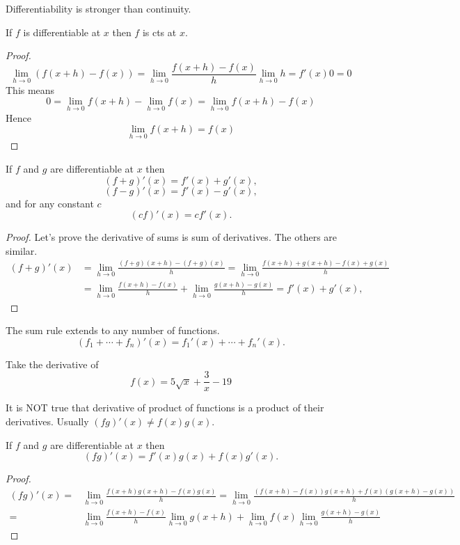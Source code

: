 \documentclass[calc1-main.tex]{subfiles}
\begin{document}
  Differentiability is stronger than continuity.
  \begin{theorem}
    If $f$ is differentiable at $x$ then $f$ is cts at $x$.
  \end{theorem}

  \begin{proof}
    \[
      \lim_{h \to 0} (f(x+h) - f(x)) =
      \lim_{h \to 0} \dfrac{f(x+h) - f(x)}{h}
      \lim_{h \to 0} h = f'(x) 0 = 0
    \]
    This means
    \[
      0 =
      \lim_{h \to 0} f(x+h) - \lim_{h \to 0} f(x) =
      \lim_{h \to 0} f(x+h) - f(x)
    \]
    Hence
    \[
      \lim_{h \to 0} f(x+h) = f(x)
    \]
  \end{proof}

  \begin{theorem}
    If $f$ and $g$ are differentiable at $x$ then
    \[
      (f+g)'(x) = f'(x) + g'(x),
    \]
    \[
      (f-g)'(x) = f'(x) - g'(x),
    \]
    and for any constant $c$
    \[
      (c f)'(x) = c f'(x).
    \]
  \end{theorem}
  \begin{proof}
    Let's prove the derivative of sums is sum of derivatives. The others are similar.
    \[
      \begin{split}
        (f+g)'(x) &=
        \lim_{h \to 0} \frac{(f+g)(x+h) - (f+g)(x)}{h} =
        \lim_{h \to 0} \frac{f(x+h)+g(x+h) - f(x)+g(x)}{h} \\
        & = \lim_{h \to 0} \frac{f(x+h)-f(x)}{h} +
        \lim_{h \to 0} \frac{g(x+h)-g(x)}{h} =
        f'(x) + g'(x),
      \end{split}
    \]
  \end{proof}

  The sum rule extends to any number of functions.
  \[
    (f_1 + \cdots + f_n)'(x) = f_1'(x) + \cdots + f_n'(x).
  \]

  \begin{example}
    Take the derivative of
    \[
      f(x) = 5 \sqrt{x} + \frac{3}{x} - 19
    \]
  \end{example}

  It is NOT true that derivative of product of functions is a product of their derivatives. Usually $(fg)'(x) \neq f(x) g(x)$.

  \begin{theorem}
    If $f$ and $g$ are differentiable at $x$ then
    \[
      (f g)'(x) = f'(x) g(x) + f(x) g'(x).
    \]
  \end{theorem}
  \begin{proof}
     \[
       \begin{split}
        (fg)'(x) = & \lim_{h \to 0} \frac{f(x+h)g(x+h)-f(x)g(x)}{h} =
        \lim_{h \to 0} \frac{\left( f(x+h)-f(x) \right)g(x+h) + f(x)\left( g(x+h) -g(x) \right)}{h} \\
        = & \lim_{h \to 0} \frac{f(x+h)-f(x)}{h} \lim_{h \to 0 }g(x+h) +
        \lim_{h \to 0} f(x) \lim_{h \to 0} \frac{g(x+h) -g(x) }{h}
       \end{split}
     \]
  \end{proof}
\end{document}
